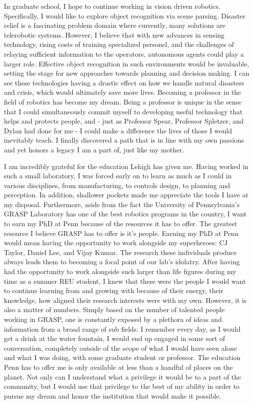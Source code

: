 \documentclass{article}
\begin{document}
In graduate school, I hope to continue working in vision driven robotics.
Specifically, I would like to explore object recognition via scene parsing.
Disaster relief is a fascinating problem domain where currently, many solutions
are telerobotic systems. However, I believe that with new advances in sensing
technology, rising costs of training specialized personel, and the challenges
of relaying sufficient information to the operators, autonomous agents could
play a larger role. Effective object recognition in such environments would be
invaluable, setting the stage for new approaches towards planning and decision
making. I can see these technologies having a drastic effect on how we handle
natural disasters and crisis, which would ultimately save more lives. Becoming
a professor in the field of robotics has become my dream. Being a professor is
unique in the sense that I could simultaneously commit myself to developing
useful technology that helps and protects people, and - just as Professor
Spear, Professor Spletzer, and Dylan had done for me - I could make a
difference the lives of those I would inevitably teach. I finally discovered a
path that is in line with my own passions and yet honors a legacy I am a part
of, just like my mother.


I am incredibly grateful for the education Lehigh has given me. Having worked
in such a small laboratory, I was forced early on to learn as much as I could
in various disciplines, from manufacturing, to controls design, to planning and
perception. In addition, shallower pockets made me appreciate the tools I have
at my disposal. Furthermore, aside from the fact the University of
Pennsylvania’s GRASP Laboratory has one of the best robotics programs in the
country, I want to earn my PhD at Penn because of the resources it has to
offer. The greatest resource I believe GRASP has to offer is it's people.
Earning my PhD at Penn would mean having the opportunity to work alongside my
superheroes: CJ Taylor, Daniel Lee, and Vijay Kumar. The research these
individuals produce always leads them to becoming a focal point of our lab's
idolatry. After having had the opportunity to work alongside such larger than
life figures during my time as a summer REU student, I knew that these were the
people I would want to continue learning from and growing with because of their
energy, their knowledge, how aligned their research interests were with my own.
However, it is also a matter of numbers. Simply based on the number of talented
people working in GRASP, one is constantly exposed by a plethora of ideas and
information from a broad range of sub fields.  I remember every day, as I would
get a drink at the water fountain,  I would end up engaged in some sort of
conversation, completely outside of the scope of what I would have seen alone
and what I was doing, with some graduate student or professor. The education
Penn has to offer me is only available at less than a handful of places on the
planet. Not only can I understand what a privilege it would be to a part of the
community, but I would use that privilege to the best of my ability in order to
pursue my dream and honor the institution that would make it possible.
\end{document}
